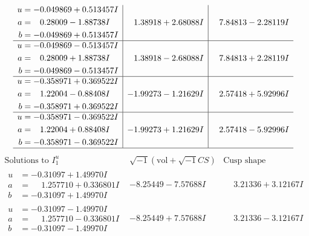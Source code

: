 \documentclass[1p]{elsarticle_modified}
\theoremstyle{definition}
\newcommand{\I}{\sqrt{-1}}
\begin{document}
$$\begin{array}{c|c|c}
\begin{aligned}
u &= -0.049869 + 0.513457 I \\
a &= \phantom{-}0.28009 - 1.88738 I \\
b &= -0.049869 + 0.513457 I\end{aligned}
 & \phantom{-}1.38918 + 2.68088 I & \phantom{-}7.84813 - 2.28119 I \\ \hline\begin{aligned}
u &= -0.049869 - 0.513457 I \\
a &= \phantom{-}0.28009 + 1.88738 I \\
b &= -0.049869 - 0.513457 I\end{aligned}
 & \phantom{-}1.38918 - 2.68088 I & \phantom{-}7.84813 + 2.28119 I \\ \hline\begin{aligned}
u &= -0.358971 + 0.369522 I \\
a &= \phantom{-}1.22004 - 0.88408 I \\
b &= -0.358971 + 0.369522 I\end{aligned}
 & -1.99273 - 1.21629 I & \phantom{-}2.57418 + 5.92996 I \\ \hline\begin{aligned}
u &= -0.358971 - 0.369522 I \\
a &= \phantom{-}1.22004 + 0.88408 I \\
b &= -0.358971 - 0.369522 I\end{aligned}
 & -1.99273 + 1.21629 I & \phantom{-}2.57418 - 5.92996 I\\
 \hline 
 \end{array}$$\newpage$$\begin{array}{c|c|c}  
\text{Solutions to }I^u_{1}& \I (\text{vol} + \sqrt{-1}CS) & \text{Cusp shape}\\
 \hline 
\begin{aligned}
u &= -0.31097 + 1.49970 I \\
a &= \phantom{-}1.257710 + 0.336801 I \\
b &= -0.31097 + 1.49970 I\end{aligned}
 & -8.25449 - 7.57688 I & \phantom{-}3.21336 + 3.12167 I \\ \hline\begin{aligned}
u &= -0.31097 - 1.49970 I \\
a &= \phantom{-}1.257710 - 0.336801 I \\
b &= -0.31097 - 1.49970 I\end{aligned}
 & -8.25449 + 7.57688 I & \phantom{-}3.21336 - 3.12167 I \\ \hline\begin{aligned}

\end{aligned}
\end{array}$$
\end{document}
